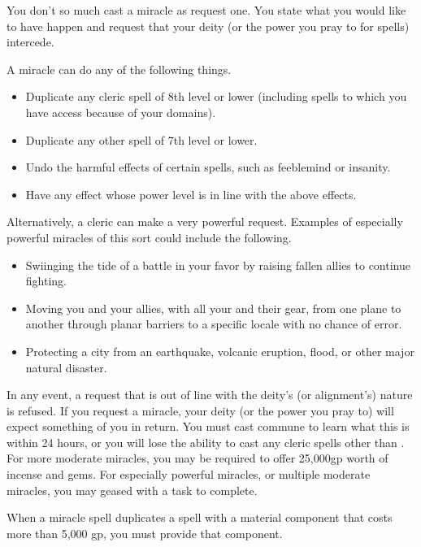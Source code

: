 \spelleffect You don't so much cast a miracle as request one. You state what you would like to have happen and request that your deity (or the power you pray to for spells) intercede.
\par A miracle can do any of the following things.
\begin{itemize}
    \item Duplicate any cleric spell of 8th level or lower (including spells to which you have access because of your domains). 
    \item Duplicate any other spell of 7th level or lower.
    \item Undo the harmful effects of certain spells, such as feeblemind or insanity.
    \item Have any effect whose power level is in line with the above effects.
\end{itemize}
\par Alternatively, a cleric can make a very powerful request. Examples of especially powerful miracles of this sort could include the following.
\begin{itemize}
    \item Swiinging the tide of a battle in your favor by raising fallen allies to continue fighting.
    \item Moving you and your allies, with all your and their gear, from one plane to another through planar barriers to a specific locale with no chance of error.
    \item Protecting a city from an earthquake, volcanic eruption, flood, or other major natural disaster.
\end{itemize}
\par In any event, a request that is out of line with the deity's (or alignment's) nature is refused.
\spellnotes If you request a miracle, your deity (or the power you pray to) will expect something of you in return. You must cast commune to learn what this is within 24 hours, or you will lose the ability to cast any cleric spells other than . For more moderate miracles, you may be required to offer 25,000gp worth of incense and gems. For especially powerful miracles, or multiple moderate miracles, you may geased with a task to complete.
\par When a miracle spell duplicates a spell with a material component that costs more than 5,000 gp, you must provide that component.

